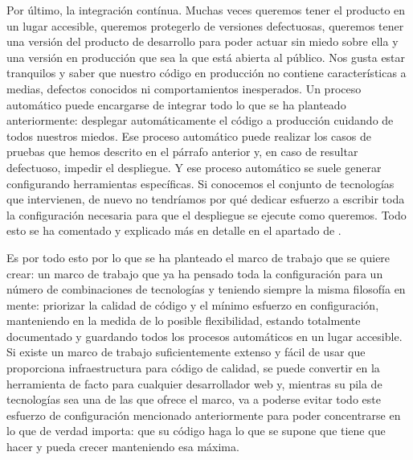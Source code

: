Por último, la integración contínua. Muchas veces queremos tener el producto en un lugar accesible, queremos protegerlo de versiones defectuosas, queremos tener una versión del producto de desarrollo para poder actuar sin miedo sobre ella y una versión en producción que sea la que está abierta al público. Nos gusta estar tranquilos y saber que nuestro código en producción no contiene características a medias, defectos conocidos ni comportamientos inesperados. Un proceso automático puede encargarse de integrar todo lo que se ha planteado anteriormente: desplegar automáticamente el código a producción cuidando de todos nuestros miedos. Ese proceso automático puede realizar los casos de pruebas que hemos descrito en el párrafo anterior y, en caso de resultar defectuoso, impedir el despliegue. Y ese proceso automático se suele generar configurando herramientas específicas. Si conocemos el conjunto de tecnologías que intervienen, de nuevo no tendríamos por qué dedicar esfuerzo a escribir toda la configuración necesaria para que el despliegue se ejecute como queremos. Todo esto se ha comentado y explicado más en detalle en el apartado de .

Es por todo esto por lo que se ha planteado el marco de trabajo que se quiere crear: un marco de trabajo que ya ha pensado toda la configuración para un número de combinaciones de tecnologías y teniendo siempre la misma filosofía en mente: priorizar la calidad de código y el mínimo esfuerzo en configuración, manteniendo en la medida de lo posible flexibilidad, estando totalmente documentado y guardando todos los procesos automáticos en un lugar accesible. Si existe un marco de trabajo suficientemente extenso y fácil de usar que proporciona infraestructura para código de calidad, se puede convertir en la herramienta de facto para cualquier desarrollador web y, mientras su pila de tecnologías sea una de las que ofrece el marco, va a poderse evitar todo este esfuerzo de configuración mencionado anteriormente para poder concentrarse en lo que de verdad importa: que su código haga lo que se supone que tiene que hacer y pueda crecer manteniendo esa máxima.
